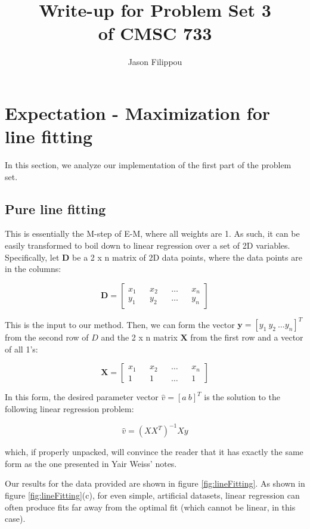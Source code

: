 \documentclass[11pt]{article} %
\title{Write-up for Problem Set 3 \\ of CMSC 733 }
\author{Jason Filippou}
\begin{document}
\maketitle

\tableofcontents

\section{Expectation - Maximization for line fitting}

In this section, we analyze our implementation of the first part of the problem set.  

\subsection{Pure line fitting}
\label{sec:pureLineFit}
This is essentially the M-step of E-M, where all weights are 1. As such, it can be easily transformed to boil down to linear regression over a set of
2D variables. Specifically, let $\mathbf{D}$ be a 2 x n matrix of 2D data points, where the data points are in the columns:

$$\mathbf{D} = \begin{bmatrix} x_1 && x_2 && \dots && x_n \\ y_1 && y_2 && \dots && y_n \end {bmatrix}$$

This is the input to our method. Then, we can form the vector $\mathbf{y} = [y_1\ y_2\ \dots y_n]^T$ from the second row of $D$ and the 2 x n matrix $\mathbf{X}$ from the first row and a vector of all 1's:

$$\mathbf{X} = \begin{bmatrix} x_1 && x_2 && \dots && x_n \\ 1 && 1 && \dots && 1 \end {bmatrix}$$

In this form, the desired parameter vector $\hat{v} = [a\ b]^T$ is the solution to the following linear regression problem:

\begin{equation}
	\hat{v} = (X X^T) ^{-1}  Xy
\label{eqn:linreg}
\end{equation}

which, if properly unpacked, will convince the reader that it has exactly the same form as the one presented in Yair Weiss' notes.

Our results for the data provided are shown in figure \ref{fig:lineFitting}. As shown in figure \ref{fig:lineFitting}(c), for even simple, artificial datasets,
linear regression can often produce fits far away from the optimal fit (which cannot be linear, in this case).
\end{document}
